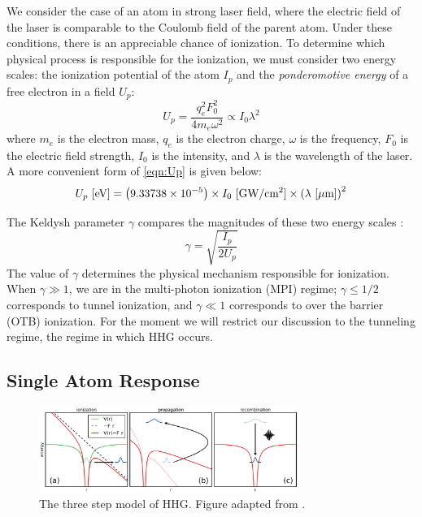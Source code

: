 We consider the case of an atom in strong laser field, where the electric field of the laser is comparable to the Coulomb field of the parent atom. Under these conditions, there is an appreciable chance of ionization. To determine which physical process is responsible for the ionization, we must consider two energy scales: the ionization potential of the atom $I_p$ and the \textit{ponderomotive energy} of a free electron in a field $U_p$:
\begin{equation}
U_p = \frac{q_e^2 F_0^2}{4 m_e \omega^2} \propto I_0 \lambda^2
\label{eqn:Up}
\end{equation}
where $m_e$ is the electron mass, $q_e$ is the electron charge, $\omega$ is the frequency, $F_0$ is the electric field strength, $I_0$ is the intensity, and $\lambda$ is the wavelength of the laser. A more convenient form of \cref{eqn:Up} is given below:
\begin{equation}
U_p \textrm{ [eV]} = \left( 9.33738 \times 10^{-5} \right) \times I_0 \ \textrm{[GW/cm\textsuperscript{2}]} \times \left(\lambda \ [\mu \textrm{m}] \right)^2
\label{eqn:Up-numbers}
\end{equation}

The Keldysh parameter $\gamma$ compares the magnitudes of these two energy scales \cite{keldyshIonizationFieldStrong1965}:
\begin{equation}
\gamma = \sqrt{\frac{I_p}{2 U_p}}
\end{equation}
The value of $\gamma$ determines the physical mechanism responsible for ionization. When ${\gamma \gg 1}$, we are in the multi-photon ionization (MPI) regime; ${\gamma \le 1/2}$ corresponds to tunnel ionization, and ${\gamma \ll 1}$ corresponds to over the barrier (OTB) ionization. For the moment we will restrict our discussion to the tunneling regime, the regime in which HHG occurs.

%
%
%
%

\subsection{Single Atom Response}
\label{sec:single-atom-response}

\begin{figure}
	\centering
	\includegraphics[width=0.75\textwidth]{figures/chap1/ThreeStepModel.png}
	\caption{The three step model of HHG. Figure adapted from \cite{schounAttosecondHighHarmonicSpectroscopy2015}.}
	\label{fig:ThreeStepModel}
\end{figure}

